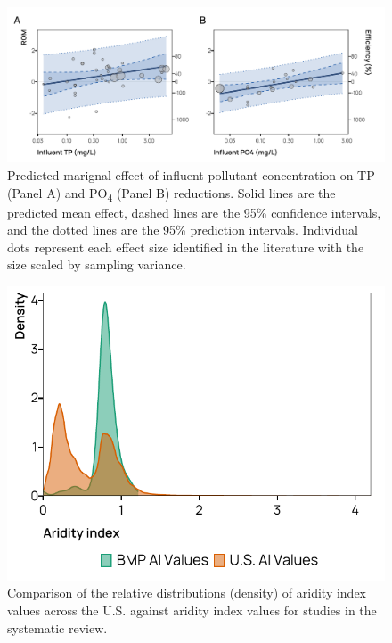 \documentclass[utf8]{FrontiersinHarvard}
\begin{document}
\begin{figure}[p]
\includegraphics[width=1\linewidth,]{../figures/phos_predicted} \caption{Predicted marignal effect of influent pollutant concentration on TP (Panel A) and PO\textsubscript{4} (Panel B) reductions. Solid lines are the predicted mean effect, dashed lines are the 95\% confidence intervals, and the dotted lines are the 95\% prediction intervals. Individual dots represent each effect size identified in the literature with the size scaled by sampling variance.}\label{fig:phoseffect}
\end{figure}

\begin{figure}[p]
\includegraphics[width=0.5\linewidth,]{../figures/aridity_density} \caption{Comparison of the relative distributions (density) of aridity index values across the U.S. against aridity index values for studies in the systematic review.}\label{fig:aiindex}
\end{figure}
\end{document}
